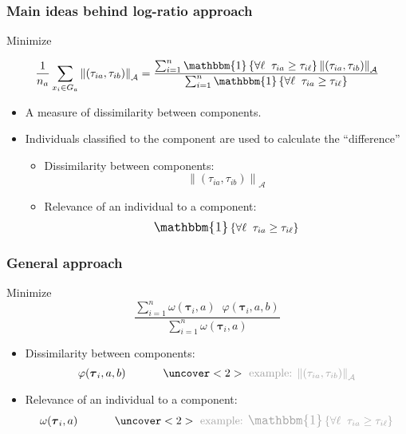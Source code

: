 \begin{frame}[t]
\frametitle{Main ideas behind log-ratio approach}
\small
Minimize
\begin{center}
\[
\frac{1}{n_a} \sum_{x_i \in G_a} \left\| (\tau_{ia}, \tau_{ib}) \right\|_{\mathcal{A}}  =
\frac%
{ \sum_{i=1}^n \mathlarger{\mathbbm{1}}\left\{ \forall \ell\; \; \tau_{ia} \geq \tau_{i\ell}  \right\} \left\| (\tau_{ia}, \tau_{ib}) \right\|_{\mathcal{A}}  }%
{ \sum_{i=1}^n \mathlarger{\mathbbm{1}}\left\{ \forall \ell\; \; \tau_{ia} \geq \tau_{i\ell}  \right\}  }
\]
\end{center}
\begin{itemize}
\item A measure of dissimilarity between components.
\item Individuals classified to the component are used to calculate the ``difference''

\begin{itemize}
\item Dissimilarity between components: \[\left\| (\tau_{ia}, \tau_{ib}) \right\|_{\mathcal{A}}\]
\item Relevance of an individual to a component: \[\mathlarger{\mathbbm{1}}\left\{ \forall \ell\; \; \tau_{ia} \geq \tau_{i\ell} \right\} \]
\end{itemize}

\end{itemize}

\end{frame}

\begin{frame}
\frametitle{General approach}
\small

Minimize
\[
\frac{ 
\sum_{i=1}^n \omega(\boldsymbol\tau_i, a) \;\; \varphi(\boldsymbol\tau_i, a, b) 
}{ 
\sum_{i=1}^n \omega(\boldsymbol\tau_i, a)
}
\]

\begin{itemize}
\item Dissimilarity between components: 
\[ \varphi(\boldsymbol\tau_i, a, b) \;\;\;\;\;\;\;\;\;\;\;\; \idea{\text{   example: $\left\| (\tau_{ia}, \tau_{ib}) \right\|_{\mathcal{A}}$}} \]
\item Relevance of an individual to a component: \[ \omega(\boldsymbol\tau_i, a) \;\;\;\;\;\;\;\;\;\;\;\; \idea{\text{   example: $\mathlarger{\mathbbm{1}}\left\{ \forall \ell\; \; \tau_{ia} \geq \tau_{i\ell}  \right\}$}} \]
\end{itemize}

\end{frame}

